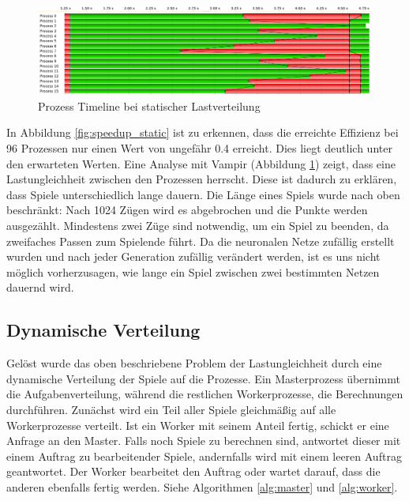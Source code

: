 \begin{figure}
    \centering
    \includegraphics[width=\textwidth]
        {content/img/vampir_static.png}
        \caption{Prozess Timeline bei statischer Lastverteilung}
    \label{fig:vampir_static}
\end{figure}

In Abbildung \ref{fig:speedup_static} ist zu erkennen, dass die erreichte
Effizienz bei 96 Prozessen nur einen Wert von ungefähr \num{0,4} erreicht.
Dies liegt deutlich unter den erwarteten Werten. Eine Analyse mit Vampir \cite{vampir}
(Abbildung \ref{fig:vampir_static}) zeigt, dass eine Lastungleichheit zwischen den
Prozessen herrscht. Diese ist dadurch zu erklären, dass Spiele unterschiedlich
lange dauern. Die Länge eines Spiels wurde nach oben beschränkt: Nach 1024
Zügen wird es abgebrochen und die Punkte werden ausgezählt. Mindestens zwei
Züge sind notwendig, um ein Spiel zu beenden, da zweifaches Passen zum
Spielende führt.
Da die neuronalen Netze zufällig erstellt wurden und nach jeder Generation
zufällig verändert werden, ist es uns nicht möglich vorherzusagen, wie lange ein
Spiel zwischen zwei bestimmten Netzen dauernd wird.

\subsection{Dynamische Verteilung}

Gelöst wurde das oben beschriebene Problem der Lastungleichheit durch eine
dynamische Verteilung der Spiele auf die Prozesse.  Ein Masterprozess übernimmt
die Aufgabenverteilung, während die restlichen Workerprozesse, die Berechnungen
durchführen.  Zunächst wird ein Teil aller Spiele gleichmäßig auf alle
Workerprozesse verteilt. Ist ein Worker mit seinem Anteil fertig, schickt er
eine Anfrage an den Master. Falls noch Spiele zu berechnen sind, antwortet
dieser mit einem Auftrag zu bearbeitender Spiele, andernfalls wird mit einem
leeren Auftrag geantwortet.  Der Worker bearbeitet den Auftrag oder wartet
darauf, dass die anderen ebenfalls fertig werden.  Siehe Algorithmen
\ref{alg:master} und \ref{alg:worker}.

